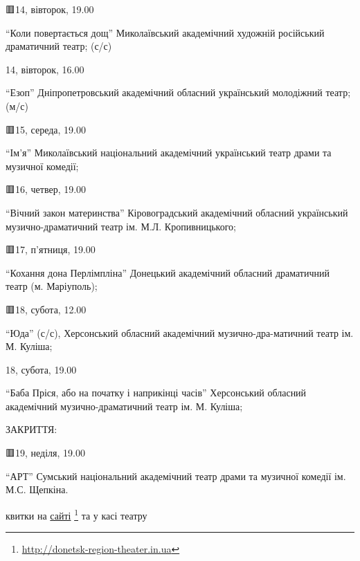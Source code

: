 🟥14, вівторок, 19.00 

\enquote{Коли повертається дощ} Миколаївський академічний художній російський
драматичний театр; (с/с)

	 14, вівторок, 16.00 

\enquote{Езоп} Дніпропетровський академічний обласний український молодіжний театр;
(м/с)

🟥15, середа, 19.00 

\enquote{Ім'я} Миколаївський національний академічний український театр драми
та музичної комедії;

🟥16, четвер, 19.00 

\enquote{Вічний закон материнства} Кіровоградський академічний обласний український
музично-драматичний театр ім. М.Л. Кропивницького;

🟥17, п'ятниця, 19.00 

\enquote{Кохання дона Перлімпліна} Донецький академічний обласний драматичний театр (м.
Маріуполь);

🟥18, субота, 12.00 

\enquote{Юда} (с/с), Херсонський обласний академічний музично-дра\hyp{}матичний театр ім. М.
Куліша;

		 18, субота, 19.00 

\enquote{Баба Пріся, або на початку і наприкінці часів} Херсонський обласний
академічний музично-драматичний театр ім. М. Куліша;

ЗАКРИТТЯ:

🟥19, неділя, 19.00 

\enquote{АРТ} Сумський національний академічний театр драми та музичної комедії ім.
М.С. Щепкіна.

квитки на \href{http://donetsk-region-theater.in.ua}{сайті}%
\footnote{\url{http://donetsk-region-theater.in.ua}} та у касі театру

